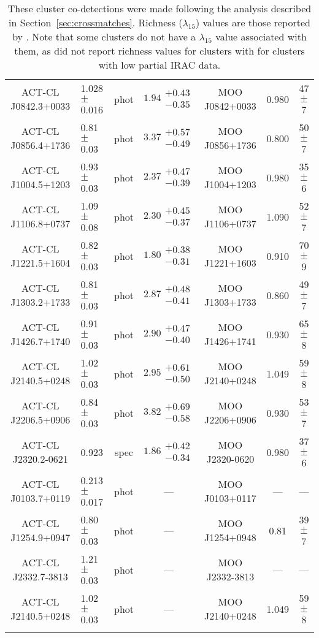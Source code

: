 \begin{longtable}[p!]{clccccc}
ACT-CL J0842.3+0033 & 1.028$\pm$ 0.016 & phot & $1.94\substack{+0.43\\-0.35}$ & MOO J0842+0033 & 0.980 & 47$\pm$ 7 \\
ACT-CL J0856.4+1736 & 0.81$\pm$ 0.03 & phot & $3.37\substack{+0.57\\-0.49}$ & MOO J0856+1736 & 0.800 & 50$\pm$ 7 \\
ACT-CL J1004.5+1203 & 0.93$\pm$ 0.03 & phot & $2.37\substack{+0.47\\-0.39}$ & MOO J1004+1203 & 0.980 & 35$\pm$ 6 \\
ACT-CL J1106.8+0737 & 1.09$\pm$ 0.08 & phot & $2.30\substack{+0.45\\-0.37}$ & MOO J1106+0737 & 1.090 & 52$\pm$ 7 \\
ACT-CL J1221.5+1604 & 0.82$\pm$ 0.03 & phot & $1.80\substack{+0.38\\-0.31}$ & MOO J1221+1603 & 0.910 & 70$\pm$ 9 \\
ACT-CL J1303.2+1733 & 0.81$\pm$ 0.03 & phot & $2.87\substack{+0.48\\-0.41}$ & MOO J1303+1733 & 0.860 & 49$\pm$ 7 \\
ACT-CL J1426.7+1740 & 0.91$\pm$ 0.03 & phot & $2.90\substack{+0.47\\-0.40}$ & MOO J1426+1741 & 0.930 & 65$\pm$ 8 \\
ACT-CL J2140.5+0248 & 1.02$\pm$ 0.03 & phot & $2.95\substack{+0.61\\-0.50}$ & MOO J2140+0248 & 1.049 & 59$\pm$ 8 \\
ACT-CL J2206.5+0906 & 0.84$\pm$ 0.03 & phot & $3.82\substack{+0.69\\-0.58}$ & MOO J2206+0906 & 0.930 & 53$\pm$ 7 \\
ACT-CL J2320.2-0621 & 0.923& spec & $1.86\substack{+0.42\\-0.34}$ & MOO J2320-0620 & 0.980 & 37$\pm$ 6 \\
ACT-CL J0103.7+0119 & 0.213$\pm$ 0.017 & phot & --- & MOO J0103+0117 & --- & ---\\
ACT-CL J1254.9+0947 & 0.80$\pm$ 0.03 & phot & --- & MOO J1254+0948 & 0.81 & 39$\pm$ 7 \\
ACT-CL J2332.7-3813 & 1.21$\pm$ 0.03 & phot & ---& MOO J2332-3813 & --- & ---\\
ACT-CL J2140.5+0248 & 1.02$\pm$ 0.03 & phot & --- & MOO J2140+0248 & 1.049 & 59$\pm$ 8 \\
\hline
\caption*{These cluster co-detections were made following the analysis described in Section~\ref{sec:crossmatches}. Richness ($\lambda_{15}$) values are those reported by \cite{Gonzalez2019}. Note that some clusters do not have a $\lambda_{15}$ value associated with them, as \cite{Gonzalez2019} did not report richness values for clusters with for clusters with low partial IRAC data.}
\label{Catalog:ACTCOWS}
\end{longtable}

\twocolumn

